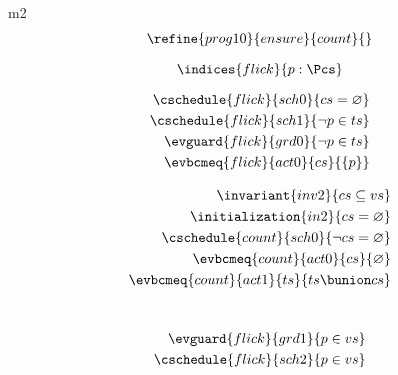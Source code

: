 \documentclass{article}
\begin{document}
\begin{machine}{m2}
\begin{align*}
	\refine{prog10}{ensure}{count}{} %
\end{align*}


\[ \indices{flick}{p : \Pcs} \]

\begin{align}
	\cschedule{flick}{sch0}{ cs = \emptyset } \\
	\cschedule{flick}{sch1}{ \neg p \in ts } \\
	\evguard{flick}{grd0}{ \neg p \in ts } \\
	\evbcmeq{flick}{act0}{cs}{ \{ p \} }
\end{align}





\begin{align}
	\invariant{inv2}{cs \subseteq vs} \\
	\initialization{in2}{ cs = \emptyset } \\
	\cschedule{count}{sch0}{ \neg cs = \emptyset } \\
	\evbcmeq{count}{act0}{cs}{\emptyset} \\
	\evbcmeq{count}{act1}{ts}{ ts \bunion cs }
\end{align}

 \\


\begin{align*}
	\evguard{flick}{grd1}{p \in vs} \\
	\cschedule{flick}{sch2}{p \in vs}
\end{align*}



\end{machine}
\end{document}
